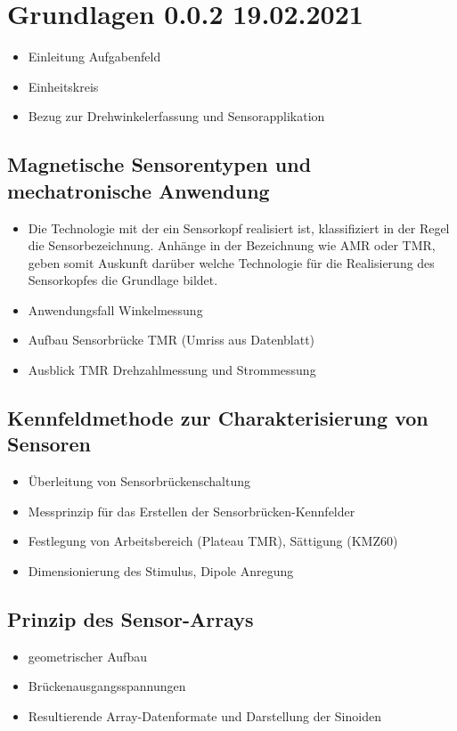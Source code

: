 %

\chapter{Grundlagen 0.0.2 19.02.2021}\label{ch:grundlagen}
	\begin{itemize}
		\item Einleitung Aufgabenfeld
		\item Einheitskreis
		\item Bezug zur Drehwinkelerfassung und Sensorapplikation
	\end{itemize}

\section{Magnetische Sensorentypen und mechatronische Anwendung}\label{sec:magnetische-sensorentypen}
	\begin{itemize}
		\item Die Technologie mit der ein Sensorkopf realisiert ist, klassifiziert in der Regel die Sensorbezeichnung. Anhänge in der Bezeichnung wie AMR oder TMR, geben somit Auskunft darüber welche Technologie für die Realisierung des Sensorkopfes die Grundlage bildet.
		\item Anwendungsfall Winkelmessung
		\item Aufbau Sensorbrücke TMR (Umriss aus Datenblatt)
		\item Ausblick TMR Drehzahlmessung und Strommessung
	\end{itemize}

\section{Kennfeldmethode zur Charakterisierung von Sensoren}\label{sec:kennfeldmethode-zur-charakterisierung}
	\begin{itemize}
		\item Überleitung von Sensorbrückenschaltung
		\item Messprinzip für das Erstellen der Sensorbrücken-Kennfelder
		\item Festlegung von Arbeitsbereich (Plateau TMR), Sättigung (KMZ60)
		\item Dimensionierung des Stimulus, Dipole Anregung
	\end{itemize}

\section{Prinzip des Sensor-Arrays}\label{sec:prinzip-des-sensor-arrays}
	\begin{itemize}
		\item geometrischer Aufbau
		\item Brückenausgangsspannungen
		\item Resultierende Array-Datenformate und Darstellung der Sinoiden
	\end{itemize}

